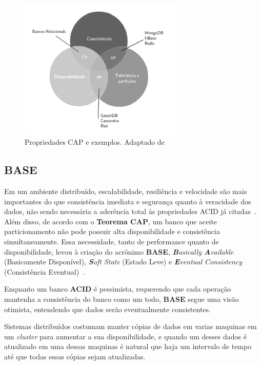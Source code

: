 \begin{figure}[!htb]
\centering
\includegraphics[width=0.7\textwidth]{figuras/cappb.png}
\caption{Propriedades CAP e exemplos. Adaptado de ~\cite{blograshid}}
\label{fig:capnosql}
\end{figure}

\subsection{BASE}
    Em um ambiente distribuído, escalabilidade, resiliência e velocidade são mais importantes do que consistência imediata e segurança quanto à veracidade dos  dados, não sendo necessária a aderência total às propriedades ACID já citadas~\cite{neo4j_acidbase}. Além disso, de acordo com o \textbf{Teorema CAP}, um banco que aceite particionamento não pode possuir alta disponibilidade e consistência simultaneamente. Essa necessidade, tanto de performance quanto de disponibilidade, levou à criação do acrônimo \textbf{BASE}, \emph{\textbf{B}asically \textbf{A}vailable} (Basicamente Disponível), \emph{\textbf{S}oft State} (Estado Leve) e \emph{\textbf{E}ventual Consistency} (Consistência Eventual)~\cite{foxcluster}. 
    
    Enquanto um banco \textbf{ACID} é pessimista, requerendo que cada operação mantenha a consistência do banco como um todo, \textbf{BASE} segue uma visão otimista, entendendo que dados serão eventualmente consistentes.
    
    Sistemas distribuídos costumam manter cópias de dados em varias maquinas em um \emph{cluster} para aumentar a sua disponibilidade, e quando um desses dados é atualizado em uma dessas maquinas é natural que haja um intervalo de tempo até que todas essas cópias sejam atualizadas.

